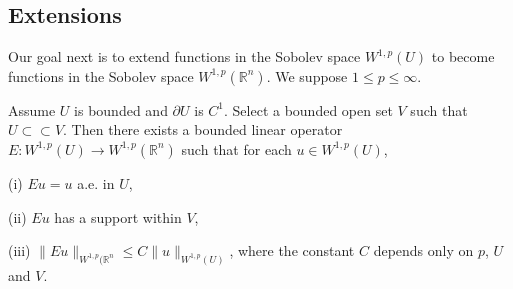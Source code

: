 \subsection{Extensions}
Our goal next is to extend functions in the Sobolev space $W^{1,p}(U)$ to become functions in the Sobolev space $W^{1,p}(\mathbb{R}^n)$. We suppose $1\le p\le\infty$.
\begin{theorem}\label{4.4.1}
Assume $U$ is bounded and $\partial U$ is $C^1$. Select a bounded open set $V$ such that $U\subset\subset V$. Then there exists a bounded linear operator $E:W^{1,p}(U)\to W^{1,p}(\mathbb{R}^n)$ such that for each $u\in W^{1,p}(U)$,\par
(i) $Eu=u$ a.e. in $U$,\par
(ii) $Eu$ has a support within $V$,\par
(iii) $\|Eu\|_{W^{1,p}(\mathbb{R}^n}\le C\|u\|_{W^{1,p}(U)}$, where the constant $C$ depends only on $p$, $U$ and $V$.
\end{theorem}

